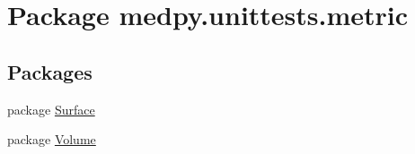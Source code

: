 \hypertarget{namespacemedpy_1_1unittests_1_1metric}{
\section{Package medpy.unittests.metric}
\label{namespacemedpy_1_1unittests_1_1metric}
}
\subsection*{Packages}
\begin{DoxyCompactItemize}
\item 
package \hyperlink{namespacemedpy_1_1unittests_1_1metric_1_1Surface}{Surface}
\item 
package \hyperlink{namespacemedpy_1_1unittests_1_1metric_1_1Volume}{Volume}
\end{DoxyCompactItemize}
